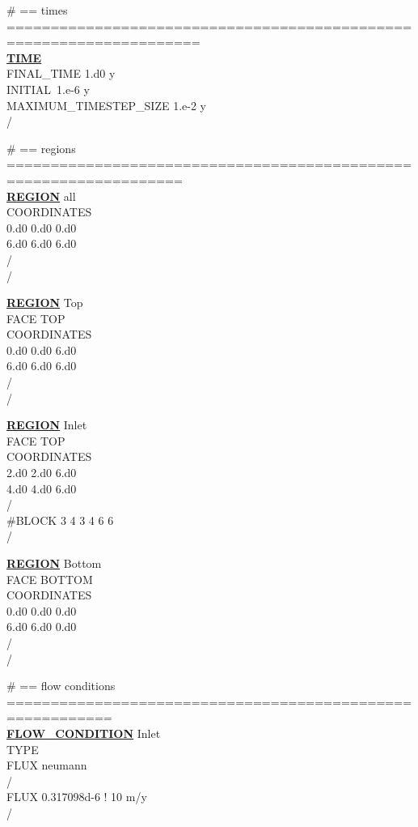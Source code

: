\noindent
\# == times ====================================================================\\
\hyperlink{target_time}{\bf TIME}\\
FINAL\_TIME 1.d0 y\\
INITIAL\ 1.e-6 y\\
MAXIMUM\_TIMESTEP\_SIZE 1.e-2 y\\
/

\noindent
\# == regions ==================================================================\\
\hyperlink{target_region}{\bf REGION} all\\
COORDINATES\\
0.d0 0.d0 0.d0\\
6.d0 6.d0 6.d0\\
/\\
/

\noindent
\hyperlink{target_region}{\bf REGION} Top\\
FACE TOP\\
COORDINATES\\
0.d0 0.d0 6.d0\\
6.d0 6.d0 6.d0\\
/\\
/

\noindent
\hyperlink{target_region}{\bf REGION} Inlet\\
FACE TOP\\
COORDINATES\\
2.d0 2.d0 6.d0\\
4.d0 4.d0 6.d0\\
/\\
\#BLOCK 3 4 3 4 6 6\\
/

\noindent
\hyperlink{target_region}{\bf REGION} Bottom\\
FACE BOTTOM\\
COORDINATES\\
0.d0 0.d0 0.d0\\
6.d0 6.d0 0.d0\\
/\\
/

\noindent
\# == flow conditions ==========================================================\\
\hyperlink{target_flow_cond}{\bf FLOW\_CONDITION} Inlet\\
TYPE\\
FLUX neumann\\
/\\
FLUX 0.317098d-6 ! 10 m/y\\
/

